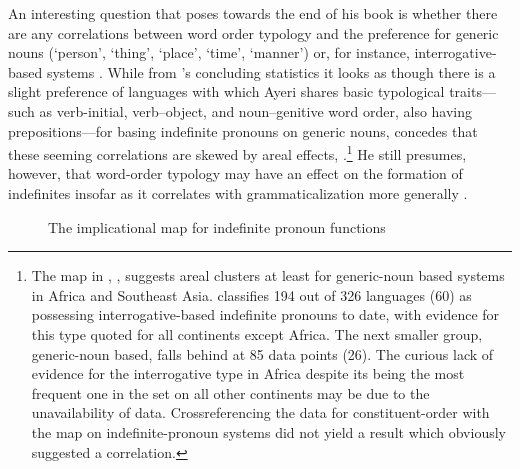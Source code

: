 An interesting question that \citet{haspelmath1997} poses towards the end
of his book is whether there are any correlations between word order typology
and the preference for generic nouns (`person', `thing', `place', `time',
`manner') or, for instance, interrogative-based systems
\citep[239--241]{haspelmath1997}. While from \citet{haspelmath1997}'s
concluding statistics it looks as though there is a slight preference of
languages with which Ayeri shares basic typological traits---such as 
verb-initial, verb–object, and noun–genitive word order, also having 
prepositions---for basing indefinite pronouns on generic nouns,
\citet{haspelmath1997} concedes that these seeming correlations are skewed
by areal effects, .\footnote{The map in ,
\citet{wals46A}, suggests areal clusters at least for generic-noun based 
systems in Africa and Southeast Asia.  classifies 194 out of 
326 languages (60\pct) as possessing interrogative-based indefinite pronouns 
to date, with evidence for this type quoted for all continents except Africa. 
The next smaller group, generic-noun based, falls behind at 85 data points 
(26\pct). The curious lack of evidence for the interrogative type in Africa 
despite its being the most frequent one in the set on all other continents may 
be due to the unavailability of data. Crossreferencing the  
data for constituent-order with the map on indefinite-pronoun systems did not 
yield a result which obviously suggested a correlation.} He still presumes, 
however, that word-order typology may have an effect on the formation of 
indefinites insofar as it correlates with grammaticalization more generally 
\citep[239]{haspelmath1997}.

\begin{figure}[tp]\centering
\caption[The implicational map for indefinite pronoun functions]{The 
implicational map for indefinite pronoun functions \citep[4]{haspelmath1997}}


\label{fig:haspeltab}
\end{figure}

